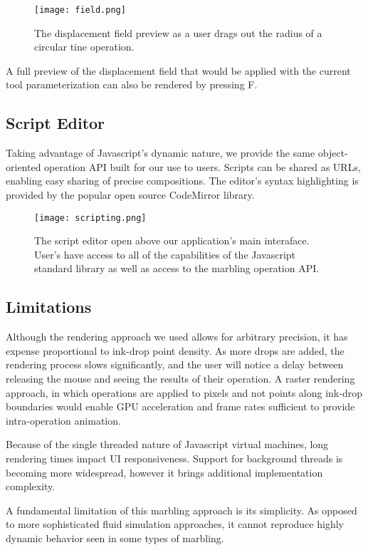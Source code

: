 \documentclass{article}
\begin{document}
\begin{figure}
    \texttt{[image: field.png]}
    \caption{The displacement field preview as a user drags out the radius of a circular tine operation.}
\end{figure}

A full preview of the displacement field that would be applied with the current tool parameterization can also be rendered by pressing F.

\subsection{Script Editor}

Taking advantage of Javascript's dynamic nature, we provide the same object-oriented operation API built for our use to users. Scripts can be shared as URLs, enabling easy sharing of precise compositions. The editor's syntax highlighting is provided by the popular open source CodeMirror library.

\begin{figure}
    \texttt{[image: scripting.png]}
    \caption{The script editor open above our application's main interaface. User's have access to all of the capabilities of the Javascript standard library as well as access to the marbling operation API.}
\end{figure}

\subsection{Limitations}

Although the rendering approach we used allows for arbitrary precision, it has expense proportional to ink-drop point density. As more drops are added, the rendering process slows significantly, and the user will notice a delay between releasing the mouse and seeing the results of their operation. A raster rendering approach, in which operations are applied to pixels and not points along ink-drop boundaries would enable GPU acceleration and frame rates sufficient to provide intra-operation animation.

Because of the single threaded nature of Javascript virtual machines, long rendering times impact UI responsiveness. Support for background threads is becoming more widespread, however it brings additional implementation complexity.

A fundamental limitation of this marbling approach is its simplicity. As opposed to more sophisticated fluid simulation approaches, it cannot reproduce highly dynamic behavior seen in some types of marbling.
\end{document}
